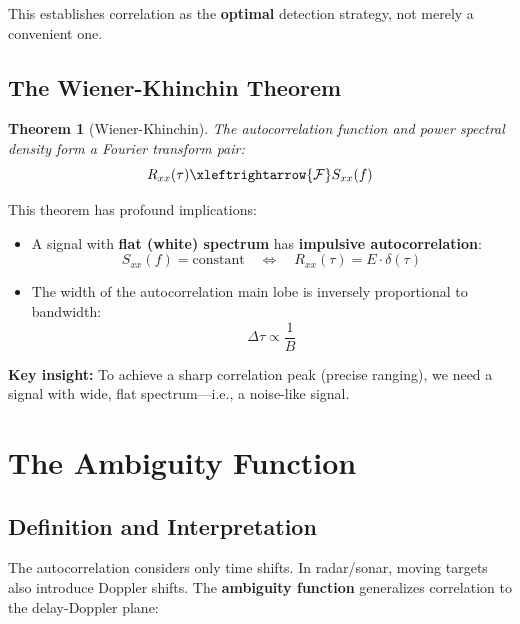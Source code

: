 \documentclass[11pt]{article}
\newtheorem{theorem}{Theorem}
\begin{document}
This establishes correlation as the \textbf{optimal} detection strategy, not merely a convenient one.

\subsection{The Wiener-Khinchin Theorem}

\begin{theorem}[Wiener-Khinchin]
The autocorrelation function and power spectral density form a Fourier transform pair:
\begin{equation}
R_{xx}(\tau) \xleftrightarrow{\mathcal{F}} S_{xx}(f)
\end{equation}
\end{theorem}

This theorem has profound implications:
\begin{itemize}
    \item A signal with \textbf{flat (white) spectrum} has \textbf{impulsive autocorrelation}:
    \begin{equation}
    S_{xx}(f) = \text{constant} \quad \Longleftrightarrow \quad R_{xx}(\tau) = E \cdot \delta(\tau)
    \end{equation}
    \item The width of the autocorrelation main lobe is inversely proportional to bandwidth:
    \begin{equation}
    \Delta\tau \propto \frac{1}{B}
    \end{equation}
\end{itemize}

\textbf{Key insight:} To achieve a sharp correlation peak (precise ranging), we need a signal with wide, flat spectrum---i.e., a noise-like signal.

\section{The Ambiguity Function}

\subsection{Definition and Interpretation}

The autocorrelation considers only time shifts. In radar/sonar, moving targets also introduce Doppler shifts. The \textbf{ambiguity function} generalizes correlation to the delay-Doppler plane:
\end{document}
